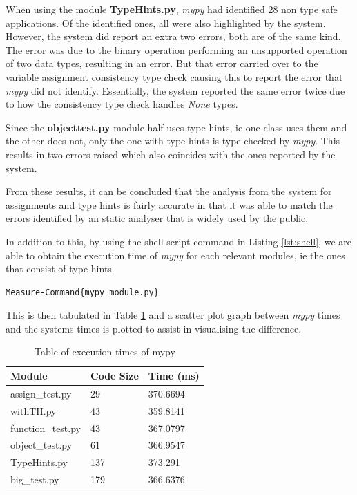\documentclass{l4proj}
\begin{document}
When using the module \textbf{TypeHints.py}, \textit{mypy} had identified 28 non type safe applications.
Of the identified ones, all were also highlighted by the system. However, the system did report an extra two errors, both are of the same kind. The error was due to the binary operation performing an unsupported operation of two data types, resulting in an error. But that error carried over to the variable assignment consistency type check causing this to report the error that \textit{mypy} did not identify. Essentially, the system reported the same error twice due to how the consistency type check handles \textit{None} types.

Since the \textbf{object\textunderscore test.py} module half uses type hints, ie one class uses them and the other does not, only the one with type hints is type checked by \textit{mypy}. This results in two errors raised which also coincides with the ones reported by the system.

From these results, it can be concluded that the analysis from the system for assignments and type hints is fairly accurate in that it was able to match the errors identified by an static analyser that is widely used by the public. 

In addition to this, by using the shell script command in Listing \ref{lst:shell}, we are able to obtain the execution time of \textit{mypy} for each relevant modules, ie the ones that consist of type hints.

\begin{lstlisting}[caption= The shell script command used to obtain the execution time of mypy where module.py is replaced with the name of the module that is going to be analysed, label={lst:shell}]
Measure-Command{mypy module.py}
\end{lstlisting}

This is then tabulated in Table \ref{tab:mypy} and a scatter plot graph between \textit{mypy} times and the systems times is plotted to assist in visualising the difference.

\begin{table}[h]
\centering
\begin{tabular}{|l|l|l|}
\hline
Module            & Code Size & Time (ms) \\ \hline
assign\_test.py   & 29        & 370.6694  \\ \hline
withTH.py         & 43        & 359.8141  \\ \hline
function\_test.py & 43        & 367.0797  \\ \hline
object\_test.py   & 61        & 366.9547  \\ \hline
TypeHints.py      & 137       & 373.291   \\ \hline
big\_test.py      & 179       & 366.6376  \\ \hline
\end{tabular}
\caption{Table of execution times of mypy}
\label{tab:mypy}
\end{table}
\end{document}
